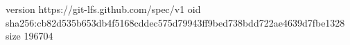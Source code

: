 version https://git-lfs.github.com/spec/v1
oid sha256:cb82d535b653db4f5168cddec575d79943ff9bed738bdd722ae4639d7fbe1328
size 196704

